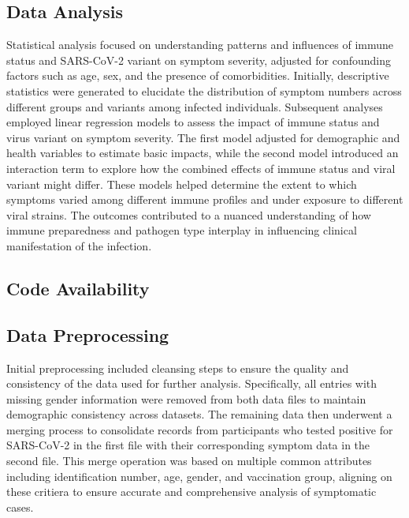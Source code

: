 \documentclass[11pt]{article}
\begin{document}
\subsection*{Data Analysis}
Statistical analysis focused on understanding patterns and influences of immune status and SARS-CoV-2 variant on symptom severity, adjusted for confounding factors such as age, sex, and the presence of comorbidities. Initially, descriptive statistics were generated to elucidate the distribution of symptom numbers across different groups and variants among infected individuals. Subsequent analyses employed linear regression models to assess the impact of immune status and virus variant on symptom severity. The first model adjusted for demographic and health variables to estimate basic impacts, while the second model introduced an interaction term to explore how the combined effects of immune status and viral variant might differ. These models helped determine the extent to which symptoms varied among different immune profiles and under exposure to different viral strains. The outcomes contributed to a nuanced understanding of how immune preparedness and pathogen type interplay in influencing clinical manifestation of the infection.\subsection*{Code Availability}

\subsection*{Data Preprocessing}
Initial preprocessing included cleansing steps to ensure the quality and consistency of the data used for further analysis. Specifically, all entries with missing gender information were removed from both data files to maintain demographic consistency across datasets. The remaining data then underwent a merging process to consolidate records from participants who tested positive for SARS-CoV-2 in the first file with their corresponding symptom data in the second file. This merge operation was based on multiple common attributes including identification number, age, gender, and vaccination group, aligning on these critiera to ensure accurate and comprehensive analysis of symptomatic cases.
\end{document}
